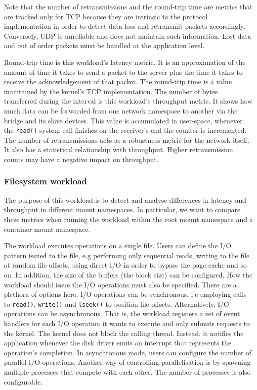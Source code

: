 Note that the number of retransmissions and the round-trip time are metrics that are tracked only 
for TCP because they are intrinsic to the protocol implementation in order to detect data loss 
and retransmit packets accordingly. Conversely, UDP is unreliable and does not maintain such information. 
Lost data and out of order packets must be handled at the application level.

Round-trip time is this workload's latency metric. 
It is an approximation of the amount of time it takes to send a packet 
to the server plus the time it takes to receive the acknowledgement of that packet. 
The round-trip time is a value maintained by the kernel's TCP implementation.
The number of bytes transferred during the interval is this workload's throughput metric.
It shows how much data can be forwarded from one network namespace to another via the bridge
and its slave devices. This value is accumulated in user-space, whenever the \verb|read()| system call 
finishes on the receiver's end the counter is incremented.
The number of retransmissions acts as a robustness metric for the network itself.
It also has a statistical relationship with throughput.
Higher retransmission counts may have a negative impact on throughput.

\subsubsection{Filesystem workload}
The purpose of this workload is to detect and analyse differences in latency and throughput in 
different mount namespaces. In particular, we want to compare these metrics when running the 
workload within the root mount namespace and a container mount namespace. 

The workload executes operations on a single file. Users can define the I/O pattern issued to the file,
e.g performing only sequential reads, writing to the file at random file offsets, using direct I/O
in order to bypass the page cache and so on. In addition, the size of the buffers (the block size)
can be configured. How the workload should issue the I/O operations must also be specified. 
There are a plethora of options here. I/O operations can be synchronous, i.e employing calls to 
\verb|read()|, \verb|write()| and \verb|lseek()| to 
position file offsets. Alternatively, I/O operations can be asynchronous. That is, 
the workload registers a set of event handlers for each I/O operation it wants to execute and only 
submits requests to the kernel. The kernel does not block the calling thread. Instead,
it notifies the application whenever the disk driver emits an interrupt that represents 
the operation's completion. In asynchronous mode, users can configure the number of parallel 
I/O operations. Another way of controlling parallelisation is by spawning multiple processes that 
compete with each other. The number of processes is also configurable.

